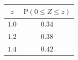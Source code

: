 {\setlength{\tabcolsep}{5pt}\renewcommand{\arraystretch}{1.25}%
\begin{tabular}{|c|c|}
\hline
$z$ & $\mathrm{P}(0\le Z\le z)$ \\
\hline
$1.0$ & $0.34$ \\
\hline
$1.2$ & $0.38$ \\
\hline
$1.4$ & $0.42$ \\
\hline
\end{tabular}}
